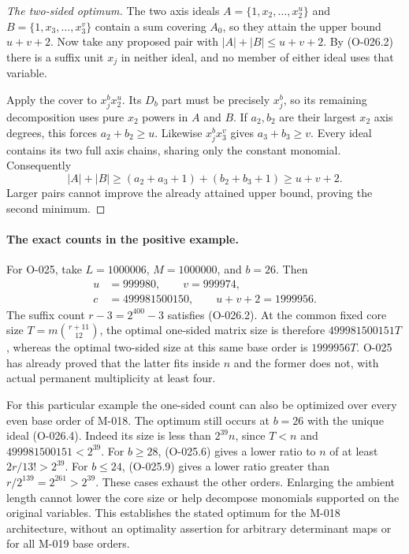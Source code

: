 \begin{proof}[The two-sided optimum]
The two axis ideals
$A=\{1,x_2,\ldots,x_2^u\}$ and
$B=\{1,x_3,\ldots,x_3^v\}$ contain a sum covering
$A_0$, so they attain the upper bound $u+v+2$.
Now take any proposed pair with
$|A|+|B|\leq u+v+2$.
By (O-026.2) there is a suffix unit $x_j$ in neither
ideal, and no member of either ideal uses that variable.

Apply the cover to $x_j^b x_2^u$.
Its $D_b$ part must be precisely $x_j^b$, so its
remaining decomposition uses pure $x_2$ powers in
$A$ and $B$. If $a_2,b_2$ are their largest $x_2$
axis degrees, this forces $a_2+b_2\geq u$.
Likewise $x_j^b x_3^v$ gives $a_3+b_3\geq v$.
Every ideal contains its two full axis chains, sharing
only the constant monomial. Consequently
\[
 |A|+|B|\geq(a_2+a_3+1)+(b_2+b_3+1)
                              \geq u+v+2.
\]
Larger pairs cannot improve the already attained upper
bound, proving the second minimum.
\end{proof}

\paragraph{The exact counts in the positive example.}
For O-025, take
$L=1000006$, $M=1000000$, and $b=26$.
Then
\[
 \begin{split}
 u&=999980,\qquad v=999974,\\
 c&=499981500150,\qquad u+v+2=1999956.
 \end{split}                                                  \tag{O-026.5}
\]
The suffix count $r-3=2^{400}-3$ satisfies (O-026.2).
At the common fixed core size
$T=m\binom{r+11}{12}$, the optimal one-sided
matrix size is therefore $499981500151T$, whereas
the optimal two-sided size at this same base order is
$1999956T$.
O-025 has already proved that the latter fits inside
$n$ and the former does not, with actual permanent
multiplicity at least four.

For this particular example the one-sided count can
also be optimized over every even base order of M-018.
The optimum still occurs at $b=26$ with the unique
ideal (O-026.4). Indeed its size is less than
$2^{39}n$, since $T<n$ and
$499981500151<2^{39}$.
For $b\geq28$, (O-025.6) gives a lower ratio to $n$
of at least $2r/13!>2^{39}$.
For $b\leq24$, (O-025.9) gives a lower ratio greater
than $r/2^{139}=2^{261}>2^{39}$.
These cases exhaust the other orders. Enlarging the
ambient length cannot lower the core size or help
decompose monomials supported on the original variables.
This establishes the stated optimum for the M-018
architecture, without an optimality assertion for
arbitrary determinant maps or for all M-019 base orders.

